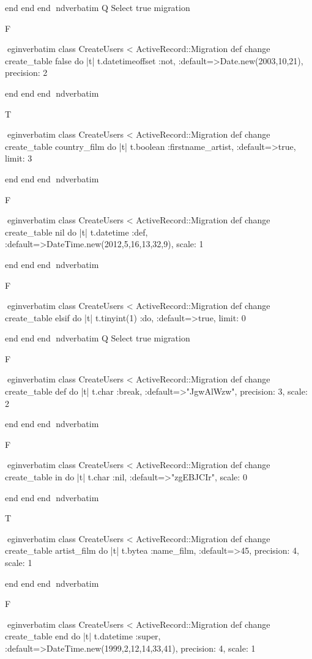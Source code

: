     end 
  end 
end
nd{verbatim}
Q
 Select true migration

F

egin{verbatim}
 class CreateUsers < ActiveRecord::Migration 
  def change 
    create_table false do |t| 
      t.datetimeoffset :not, :default=>Date.new(2003,10,21), precision: 2
    
    end 
  end 
end
nd{verbatim}

T

egin{verbatim}
 class CreateUsers < ActiveRecord::Migration 
  def change 
    create_table country_film do |t| 
      t.boolean :firstname_artist, :default=>true, limit: 3
    
    end 
  end 
end
nd{verbatim}

F

egin{verbatim}
 class CreateUsers < ActiveRecord::Migration 
  def change 
    create_table nil do |t| 
      t.datetime :def, :default=>DateTime.new(2012,5,16,13,32,9), scale: 1
    
    end 
  end 
end
nd{verbatim}

F

egin{verbatim}
 class CreateUsers < ActiveRecord::Migration 
  def change 
    create_table elsif do |t| 
      t.tinyint(1) :do, :default=>true, limit: 0
    
    end 
  end 
end
nd{verbatim}
Q
 Select true migration

F

egin{verbatim}
 class CreateUsers < ActiveRecord::Migration 
  def change 
    create_table def do |t| 
      t.char :break, :default=>"JgwAlWzw", precision: 3, scale: 2
    
    end 
  end 
end
nd{verbatim}

F

egin{verbatim}
 class CreateUsers < ActiveRecord::Migration 
  def change 
    create_table in do |t| 
      t.char :nil, :default=>"zgEBJCIr", scale: 0
    
    end 
  end 
end
nd{verbatim}

T

egin{verbatim}
 class CreateUsers < ActiveRecord::Migration 
  def change 
    create_table artist_film do |t| 
      t.bytea :name_film, :default=>45, precision: 4, scale: 1
    
    end 
  end 
end
nd{verbatim}

F

egin{verbatim}
 class CreateUsers < ActiveRecord::Migration 
  def change 
    create_table end do |t| 
      t.datetime :super, :default=>DateTime.new(1999,2,12,14,33,41), precision: 4, scale: 1
    
